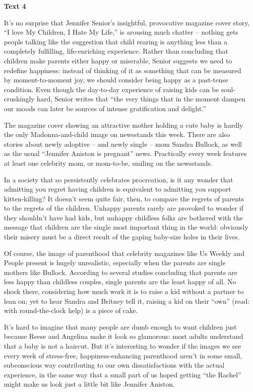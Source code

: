 \begin{center}\textbf{Text 4}\end{center}

It's no surprise that Jennifer Senior's insightful, provocative magazine cover story, ``I love My Children, I Hate My Life,'' is arousing much chatter – nothing gets people talking like the suggestion that child rearing is anything less than a completely fulfilling, life-enriching experience. Rather than concluding that children make parents either happy or miserable, Senior suggests we need to redefine happiness: instead of thinking of it as something that can be measured by moment-to-moment joy, we should consider being happy as a past-tense condition. Even though the day-to-day experience of raising kids can be soul-crushingly hard, Senior writes that ``the very things that in the moment dampen our moods can later be sources of intense gratification and delight.''

The magazine cover showing an attractive mother holding a cute baby is hardly the only Madonna-and-child image on newsstands this week. There are also stories about newly adoptive – and newly single – mom Sandra Bullock, as well as the usual ``Jennifer Aniston is pregnant'' news. Practically every week features at least one celebrity mom, or mom-to-be, smiling on the newsstands.

In a society that so persistently celebrates procreation, is it any wonder that admitting you regret having children is equivalent to admitting you support kitten-killing? It doesn't seem quite fair, then, to compare the regrets of parents to the regrets of the children. Unhappy parents rarely are provoked to wonder if they shouldn't have had kids, but unhappy childless folks are bothered with the message that children are the single most important thing in the world: obviously their misery must be a direct result of the gaping baby-size holes in their lives. 

Of course, the image of parenthood that celebrity magazines like Us Weekly and People present is hugely unrealistic, especially when the parents are single mothers like Bullock. According to several studies concluding that parents are less happy than childless couples, single parents are the least happy of all. No shock there, considering how much work it is to raise a kid without a partner to lean on; yet to hear Sandra and Britney tell it, raising a kid on their ``own'' (read: with round-the-clock help) is a piece of cake.

It's hard to imagine that many people are dumb enough to want children just because Reese and Angelina make it look so glamorous: most adults understand that a baby is not a haircut. But it's interesting to wonder if the images we see every week of stress-free, happiness-enhancing parenthood aren't in some small, subconscious way contributing to our own dissatisfactions with the actual experience, in the same way that a small part of us hoped getting ``the Rachel'' might make us look just a little bit like Jennifer Aniston.

